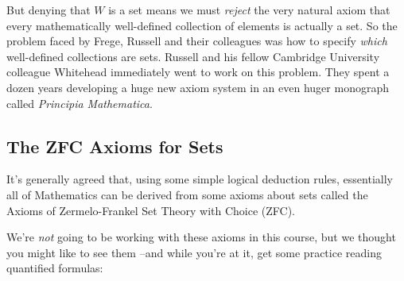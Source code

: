But denying that $W$ is a set means we must \emph{reject} the very natural
axiom that every mathematically well-defined collection of elements is
actually a set.  So the problem faced by Frege, Russell and their
colleagues was how to specify \emph{which} well-defined collections are
sets.  Russell and his fellow Cambridge University colleague Whitehead
immediately went to work on this problem.  They spent a dozen years
developing a huge new axiom system in an even huger monograph called
\emph{Principia Mathematica}.


\subsection{The ZFC Axioms for Sets}
It's generally agreed that, using some simple logical deduction rules,
essentially all of Mathematics can be derived from some axioms about sets
called the Axioms of Zermelo-Frankel Set Theory with Choice (ZFC).

We're \textit{not} going to be working with these axioms in this course,
but we thought you might like to see them --and while you're at it, get
some practice reading quantified formulas:
%

